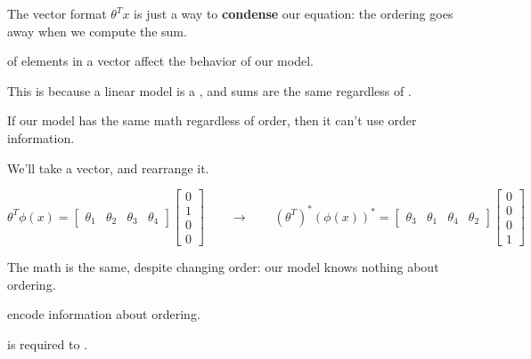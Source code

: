                 The vector format $\theta^Tx$ is just a way to \textbf{condense} our equation: the ordering goes away when we compute the sum.\\

                \begin{concept}
                     of elements in a vector  affect the behavior of our model.

                    This is because a linear model is a , and sums are the same regardless of .
                \end{concept}

                If our model has the same math regardless of order, then it can't use order information.

                \miniex We'll take a vector, and rearrange it.

                \begin{equation*}
                    \theta^T \phi(x) = 
                    \begin{bmatrix}
                        \theta_1 & \theta_2 & \theta_3 & \theta_4
                    \end{bmatrix}
                    \begin{bmatrix}
                        0\\1\\0\\0
                    \end{bmatrix}
                    \qquad\longrightarrow\qquad
                    (\theta^T)^* (\phi(x))^* = 
                    \begin{bmatrix}
                        \theta_3 & \theta_1 & \theta_4 & \theta_2
                    \end{bmatrix}
                    \begin{bmatrix}
                        0 \\ 0 \\ 0 \\ 1
                    \end{bmatrix}
                \end{equation*}

                The math is the same, despite changing order: our model knows nothing about ordering.\\

                \begin{clarification}
                      encode information about ordering.

                     is required to .
                \end{clarification}


